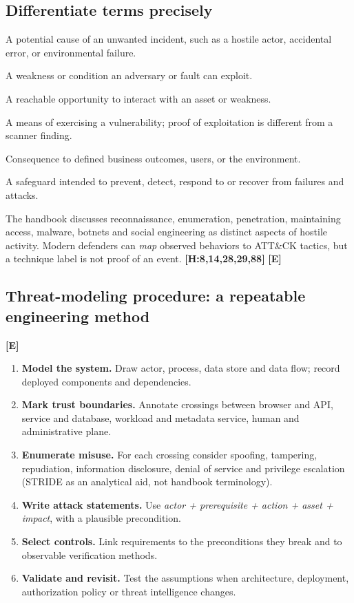 \documentclass[10pt,letterpaper,oneside]{article}
\newcommand{\handbookref}[1]{\textsf{\color{accent}\textbf{[H:#1]}}}
\newcommand{\modernext}{\textsf{\color{muted}\textbf{[E]}}}
\begin{document}
\subsection{Differentiate terms precisely}
\begin{description}[leftmargin=1.65em,style=nextline]
\item[Threat] A potential cause of an unwanted incident, such as a hostile actor, accidental error, or environmental failure.
\item[Vulnerability] A weakness or condition an adversary or fault can exploit.
\item[Exposure] A reachable opportunity to interact with an asset or weakness.
\item[Exploit] A means of exercising a vulnerability; proof of exploitation is different from a scanner finding.
\item[Impact] Consequence to defined business outcomes, users, or the environment.
\item[Control] A safeguard intended to prevent, detect, respond to or recover from failures and attacks.
\end{description}
The handbook discusses reconnaissance, enumeration, penetration, maintaining access, malware, botnets and social engineering as distinct aspects of hostile activity. Modern defenders can \emph{map} observed behaviors to ATT\&CK tactics, but a technique label is not proof of an event. \handbookref{8,14,28,29,88} \modernext{}

\subsection{Threat-modeling procedure: a repeatable engineering method}\modernext{}
\begin{enumerate}
\item \textbf{Model the system.} Draw actor, process, data store and data flow; record deployed components and dependencies.
\item \textbf{Mark trust boundaries.} Annotate crossings between browser and API, service and database, workload and metadata service, human and administrative plane.
\item \textbf{Enumerate misuse.} For each crossing consider spoofing, tampering, repudiation, information disclosure, denial of service and privilege escalation (STRIDE as an analytical aid, not handbook terminology).
\item \textbf{Write attack statements.} Use \emph{actor + prerequisite + action + asset + impact}, with a plausible precondition.
\item \textbf{Select controls.} Link requirements to the preconditions they break and to observable verification methods.
\item \textbf{Validate and revisit.} Test the assumptions when architecture, deployment, authorization policy or threat intelligence changes.
\end{enumerate}
\end{document}
